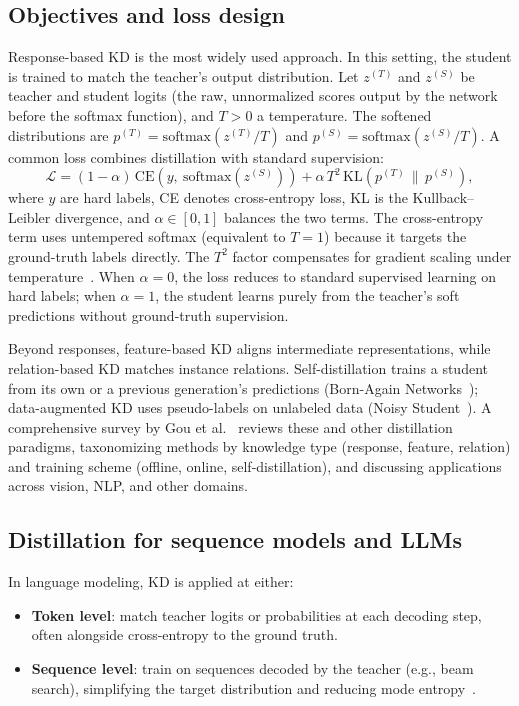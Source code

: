 \subsection{Objectives and loss design}
Response-based KD is the most widely used approach. In this setting, the student is trained to match the teacher's output distribution. Let $z^{(T)}$ and $z^{(S)}$ be teacher and student logits (the raw, unnormalized scores output by the network before the softmax function), and $T>0$ a temperature. The softened distributions are $p^{(T)}=\mathrm{softmax}(z^{(T)}/T)$ and $p^{(S)}=\mathrm{softmax}(z^{(S)}/T)$. A common loss combines distillation with standard supervision:
\begin{equation*}
\mathcal{L} = (1-\alpha)\,\mathrm{CE}(y,\ \mathrm{softmax}(z^{(S)})) + \alpha\, T^2\, \mathrm{KL}\!\left(p^{(T)} \,\|\, p^{(S)}\right),
\end{equation*}
where $y$ are hard labels, CE denotes cross-entropy loss, KL is the Kullback--Leibler divergence, and $\alpha \in [0,1]$ balances the two terms. The cross-entropy term uses untempered softmax (equivalent to $T=1$) because it targets the ground-truth labels directly. The $T^2$ factor compensates for gradient scaling under temperature~\cite{hinton2015distilling}. When $\alpha=0$, the loss reduces to standard supervised learning on hard labels; when $\alpha=1$, the student learns purely from the teacher's soft predictions without ground-truth supervision.

Beyond responses, feature-based KD aligns intermediate representations, while relation-based KD matches instance relations. Self-distillation trains a student from its own or a previous generation's predictions (Born-Again Networks~\cite{furlanello2018bornagain}); data-augmented KD uses pseudo-labels on unlabeled data (Noisy Student~\cite{xie2020noisystudent}). A comprehensive survey by Gou et al.~\cite{gou2021knowledge} reviews these and other distillation paradigms, taxonomizing methods by knowledge type (response, feature, relation) and training scheme (offline, online, self-distillation), and discussing applications across vision, NLP, and other domains.

\subsection{Distillation for sequence models and LLMs}
In language modeling, KD is applied at either:

\begin{itemize}
    \item \textbf{Token level}: match teacher logits or probabilities at each decoding step, often alongside cross-entropy to the ground truth.
    \item \textbf{Sequence level}: train on sequences decoded by the teacher (e.g., beam search), simplifying the target distribution and reducing mode entropy~\cite{kim2016sequence}.
\end{itemize}


